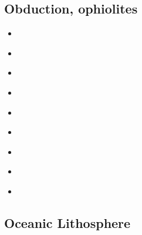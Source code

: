 \subsection{Obduction, ophiolites}
 

\begin{scriptsize}
\begin{itemize}
\item[\nineteenninety] 
\textcite{hack90} \\
\item[\nineteenninetyone] 
\textcite{hack91} \\
\item[\nineteenninetyseven] 
\textcite{rabh97} \\
\item[\twothousand] 
\textcite{mokd00} \\
\item[\twothousandfourteen] 
\textcite{agzf14} \\
\item[\twothousandsixteen] 
\textcite{duay16} \\
\item[\twothousandtwenty] 
\textcite{rohb20} \\
\item[\twothousandtwentyone] 
\textcite{pody21} \\
\item[\twothousandtwentytwo] 
\textcite{zhli22} 
\end{itemize}
\end{scriptsize}

\subsection{Oceanic Lithosphere}

